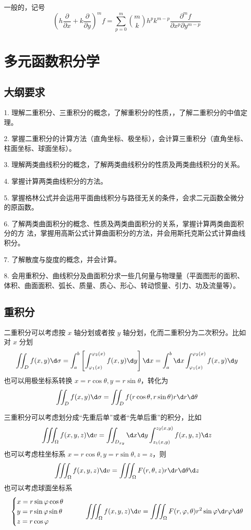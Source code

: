 一般的，记号
\[ \left(h \frac{\partial}{\partial x} + k \frac{\partial}{\partial y}\right)^m f = \sum_{p=0}^{m} \binom{m}{k} h^p k^{m-p} \frac{\partial^m f}{\partial x^p \partial y^{m-p}} \]

\section{多元函数积分学}

\subsection{大纲要求}

1. 理解二重积分、三重积分的概念，了解重积分的性质，，了解二重积分的中值定理。

2. 掌握二重积分的计算方法（直角坐标、极坐标），会计算三重积分（直角坐标、柱面坐标、球面坐标）。

3. 理解两类曲线积分的概念，了解两类曲线积分的性质及两类曲线积分的关系。

4. 掌握计算两类曲线积分的方法。

5. 掌握格林公式并会运用平面曲线积分与路径无关的条件，会求二元函数全微分的原函数。

6. 了解两类曲面积分的概念、性质及两类曲面积分的关系，掌握计算两类曲面积分的方
法，掌握用高斯公式计算曲面积分的方法，并会用斯托克斯公式计算曲线积分。

7. 了解散度与旋度的概念，并会计算。

8. 会用重积分、曲线积分及曲面积分求一些几何量与物理量（平面图形的面积、体积、曲面面积、弧长、质量、质心、形心、转动惯量、引力、功及流量等）。

\subsection{重积分}

二重积分可以考虑按 $x$ 轴分划或者按 $y$ 轴分划，化而二重积分为二次积分。比如对 $x$ 分划
\[ \iint_D f(x, y) \d \sigma = \int_{a}^{b} \left[ \int_{\varphi_1(x)}^{\varphi_2(x)} f(x, y) \d y \right] \d x = \int_{a}^{b} \d x \int_{\varphi_1(x)}^{\varphi_2(x)} f(x, y) \d y \]
也可以用极坐标系转换 $x = r \cos \theta, y = r \sin \theta$，转化为
\[ \iint_{D} f(x, y) \d \sigma = \iint_{D} f(r \cos \theta, r \sin \theta) r \d r \d \theta  \]

三重积分可以考虑划分成“先重后单”或者“先单后重”的积分，比如
\[ \iiint_{\Omega} f(x, y, z) \d v = \iint_{D_{xy}} \d x \d y \int_{z_1(x, y)}^{z_2(x, y)} f(x, y, z) \d z \]
也可以考虑柱坐标系 $x = r \cos \theta, y = r\sin\theta, z = z$，则
\[ \iiint_{\Omega} f(x, y, z) \d v = \iiint_{\Omega} F(r, \theta, z) r \d r \d \theta \d z \]
也可以考虑球面坐标系
\[ \begin{cases}
		x = r \sin \varphi \cos \theta \\
		y = r \sin \varphi \sin \theta \\
		z = r \cos \varphi
	\end{cases} \qquad \iiint_{\Omega} f(x, y, z) \d v = \iiint_{\Omega} F(r, \varphi, \theta) r^2 \sin \varphi \d r \varphi \d \theta \]


